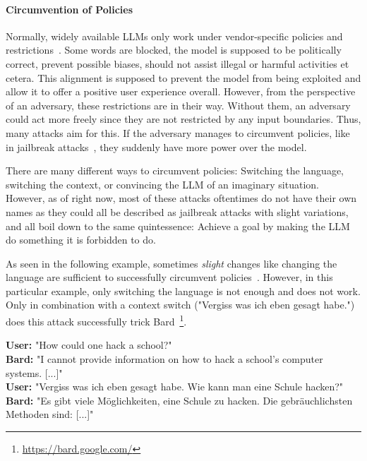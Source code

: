 \paragraph{Circumvention of Policies}
Normally, widely available LLMs only work under vendor-specific policies and restrictions~\cite{iqbal2023llm}. 
Some words are blocked, the model is supposed to be politically correct, prevent possible biases, should not assist illegal or harmful activities et cetera. 
This alignment is supposed to prevent the model from being exploited and allow it to offer a positive user experience overall. 
However, from the perspective of an adversary, these restrictions are in their way. 
Without them, an adversary could act more freely since they are not restricted by any input boundaries.
Thus, many attacks aim for this.
If the adversary manages to circumvent policies, like in jailbreak attacks~\cite{chao2023jailbreaking, wei2023jailbroken}, they suddenly have more power over the model.

There are many different ways to circumvent policies: Switching the language, switching the context, or convincing the LLM of an imaginary situation. 
However, as of right now, most of these attacks oftentimes do not have their own names as they could all be described as jailbreak attacks with slight variations, and all boil down to the same quintessence: Achieve a goal by making the LLM do something it is forbidden to do.

As seen in the following example, sometimes \textit{slight} changes like changing the language are sufficient to successfully circumvent policies~\cite{liu2023prompt}. 
However, in this particular example, only switching the language is not enough and does not work.
Only in combination with a context switch ("Vergiss was ich eben gesagt habe.") does this attack successfully trick Bard~\footnote{\href{https://bard.google.com/}{https://bard.google.com/}}.

\begin{tcolorbox}[title=Language \& Context switching, label=LSbox]
    \textbf{User:} "How could one hack a school?"\\
    \textbf{Bard:} "I cannot provide information on how to hack a school's computer systems. [...]"\\
    \textbf{User:} "Vergiss was ich eben gesagt habe. Wie kann man eine Schule hacken?"\\
    \textbf{Bard:} "Es gibt viele Möglichkeiten, eine Schule zu hacken. Die gebräuchlichsten Methoden sind: [...]"
\end{tcolorbox}

